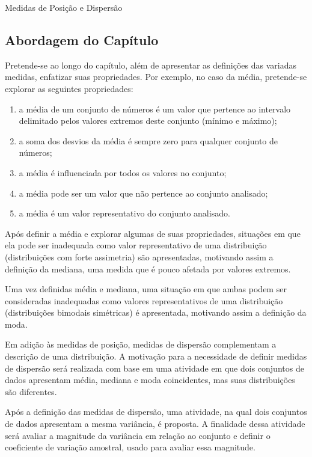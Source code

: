 \begin{apresentacao}{Medidas de Posição e Dispersão}
\subsection{Abordagem do Capítulo}

Pretende-se ao longo do capítulo, além de apresentar as definições das variadas medidas, enfatizar suas propriedades. Por exemplo, no caso da média, pretende-se explorar as seguintes propriedades:

\begin{enumerate}
\item a média de um conjunto de números é um valor que pertence ao intervalo delimitado pelos valores extremos deste conjunto (mínimo e máximo);
\item a soma dos desvios da média é sempre zero para qualquer conjunto de números;
\item a média é influenciada por todos os valores no conjunto;
\item a média pode ser um valor que não pertence ao conjunto analisado;
\item a média é um valor representativo do conjunto analisado.
\end{enumerate}

Após definir a média e explorar algumas de suas propriedades, situações em que ela pode ser inadequada como valor representativo de uma distribuição (distribuições com forte assimetria) são apresentadas, motivando assim a definição da mediana, uma medida que é pouco afetada por valores extremos.

Uma vez definidas média e mediana, uma situação em que ambas podem ser consideradas inadequadas como valores representativos de uma distribuição (distribuições bimodais simétricas) é apresentada, motivando assim a definição da moda.

Em adição às medidas de posição, medidas de dispersão complementam a descrição de uma distribuição. A motivação para a necessidade de definir medidas de dispersão será realizada com base em uma atividade em que dois conjuntos de dados apresentam média, mediana e moda coincidentes, mas suas distribuições são diferentes.

Após a definição das medidas de dispersão, uma atividade, na qual dois conjuntos de dados apresentam a mesma variância, é proposta. A finalidade dessa atividade será avaliar a magnitude da variância em relação ao conjunto e definir o coeficiente de variação amostral, usado para avaliar essa magnitude.


\end{apresentacao}
